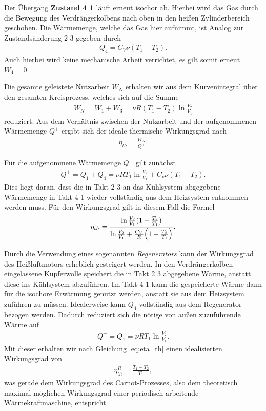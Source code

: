 Der Übergang \textbf{Zustand 4 \textrightarrow{} 1} läuft erneut isochor ab. Hierbei wird das Gas durch die Bewegung des Verdrängerkolbens nach oben in den heißen Zylinderbereich geschoben. Die Wärmemenge, welche das Gas hier aufnimmt, ist Analog zur Zustandsänderung 2 \textrightarrow{} 3 gegeben durch
\begin{align}
  Q_4 = C_V \nu (T_1 - T_2).
\end{align}
Auch hierbei wird keine mechanische Arbeit verrichtet, es gilt somit erneut $W_4 = 0$.

Die gesamte geleistete Nutzarbeit $W_N$ erhalten wir aus dem Kurvenintegral über den gesamten Kreisprozess, welches sich auf die Summe
\begin{align}
  W_N = W_1 + W_3 = \nu R(T_1 - T_2) \ln\frac{V_2}{V_1}
\end{align}
reduziert. Aus dem Verhältnis zwischen der Nutzarbeit und der aufgenommenen Wärmemenge $Q^+$ ergibt sich der ideale thermische Wirkungsgrad nach
\begin{align}
  \eta_{th} = \frac{W_N}{Q^+}. \label{eq:eta_th}
\end{align}

Für die aufgenommene Wärmemenge $Q^+$ gilt zunächst
\begin{align}
  Q^+ = Q_1 + Q_4 = \nu R T_1 \ln\frac{V_2}{V_1} + C_v \nu (T_1 - T_2).
\end{align}
Dies liegt daran, dass die in Takt 2 \textrightarrow{} 3 an das Kühlsystem abgegebene Wärmemenge in Takt 4 \textrightarrow{} 1 wieder vollständig aus dem Heizsystem entnommen werden muss. Für den Wirkungsgrad gilt in diesem Fall die Formel
\begin{align}
  \eta_{th} = \frac{\ln\frac{V_2}{V_1}(1 - \frac{T_2}{T_1})}{\ln\frac{V_2}{V_1} + \frac{C_V}{R}\qty(1 - \frac{T_2}{T_1})}.
\end{align}

Durch die Verwendung eines sogenannten \textit{Regenerators} kann der Wirkungsgrad des Heißluftmotors erheblich gesteigert werden. In den Verdrängerkolben eingelassene Kupferwolle speichert die in Takt 2 \textrightarrow{} 3 abgegebene Wärme, anstatt diese ins Kühlsystem abzuführen. Im Takt 4 \textrightarrow{} 1 kann die gespeicherte Wärme dann für die isochore Erwärmung genutzt werden, anstatt sie aus dem Heizsystem zuführen zu müssen. Idealerweise kann $Q_4$ vollständig aus dem Regenerator bezogen werden. Dadurch reduziert sich die nötige von außen zuzuführende Wärme auf
\begin{align}
  Q^+ = Q_1 = \nu R T_1 \ln\frac{V_2}{V_1}.
\end{align}
Mit dieser erhalten wir nach Gleichung \ref{eq:eta_th} einen idealisierten Wirkungsgrad von
\begin{align}
  \eta_{th}^R = \frac{T_1 - T_2}{T_1},
\end{align}
was gerade dem Wirkungsgrad des Carnot-Prozesses, also dem theoretisch maximal möglichen Wirkungsgrad einer periodisch
arbeitende Wärmekraftmaschine, entspricht.

